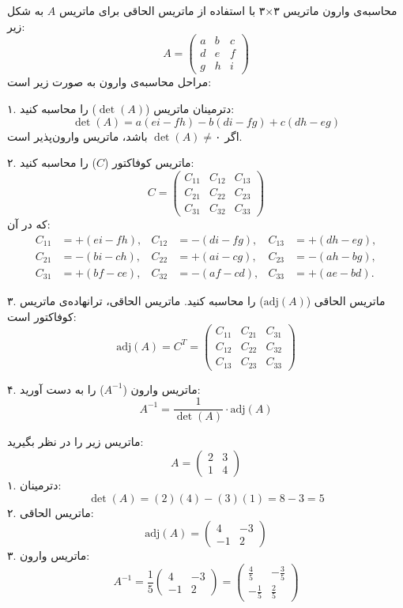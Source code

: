 \begin{nokteh}
	محاسبه‌ی وارون ماتریس ۳×۳ با استفاده از ماتریس الحاقی
	برای ماتریس \( A \) به شکل زیر:
	\[
	A = \begin{pmatrix}
		a & b & c \\
		d & e & f \\
		g & h & i
	\end{pmatrix}
	\]
	مراحل محاسبه‌ی وارون به صورت زیر است:
	
	۱. دترمینان ماتریس (\( \det(A) \)) را محاسبه کنید:
	\[
	\det(A) = a(ei - fh) - b(di - fg) + c(dh - eg)
	\]
	اگر \( \det(A) \neq ۰ \) باشد، ماتریس وارون‌پذیر است.
	
	۲. ماتریس کوفاکتور (\( C \)) را محاسبه کنید:
	\[
	C = \begin{pmatrix}
		C_{11} & C_{12} & C_{13} \\
		C_{21} & C_{22} & C_{23} \\
		C_{31} & C_{32} & C_{33}
	\end{pmatrix}
	\]
	که در آن:
	\[
	\begin{aligned}
		C_{11} &= +(ei - fh), & C_{12} &= -(di - fg), & C_{13} &= +(dh - eg), \\
		C_{21} &= -(bi - ch), & C_{22} &= +(ai - cg), & C_{23} &= -(ah - bg), \\
		C_{31} &= +(bf - ce), & C_{32} &= -(af - cd), & C_{33} &= +(ae - bd).
	\end{aligned}
	\]
	
	۳. ماتریس الحاقی (\( \text{adj}(A) \)) را محاسبه کنید. ماتریس الحاقی، ترانهاده‌ی ماتریس کوفاکتور است:
	\[
	\text{adj}(A) = C^T = \begin{pmatrix}
		C_{11} & C_{21} & C_{31} \\
		C_{12} & C_{22} & C_{32} \\
		C_{13} & C_{23} & C_{33}
	\end{pmatrix}
	\]
	
	۴. ماتریس وارون (\( A^{-1} \)) را به دست آورید:
	\[
	A^{-1} = \frac{1}{\det(A)} \cdot \text{adj}(A)
	\]
\end{nokteh}
	

	
	\begin{example}
		
	ماتریس زیر را در نظر بگیرید:
	\[
	A = \begin{pmatrix}
		2 & 3 \\
		1 & 4
	\end{pmatrix}
	\]
	۱. دترمینان:
	\[
	\det(A) = (2)(4) - (3)(1) = 8 - 3 = 5
	\]
	۲. ماتریس الحاقی:
	\[
	\text{adj}(A) = \begin{pmatrix}
		4 & -3 \\
		-1 & 2
	\end{pmatrix}
	\]
	۳. ماتریس وارون:
	\[
	A^{-1} = \frac{1}{5} \begin{pmatrix}
		4 & -3 \\
		-1 & 2
	\end{pmatrix} = \begin{pmatrix}
		\frac{4}{5} & -\frac{3}{5} \\
		-\frac{1}{5} & \frac{2}{5}
	\end{pmatrix}
	\]
	\end{example}
	
